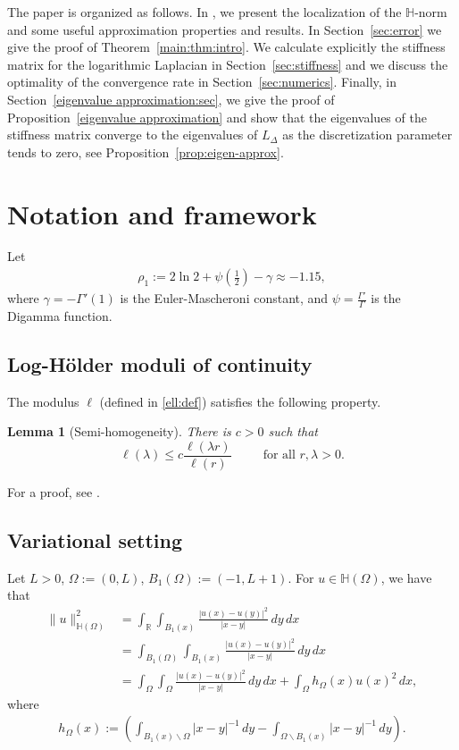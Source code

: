 \documentclass[10 pt]{article}
\newtheorem{lemma}[theorem]{Lemma}
\numberwithin{equation}{section}
\def\R{\mathbb{R}}
\def\mH{\mathbb{H}}
\begin{document}
The paper is organized as follows. In , we present the localization of the $\mathbb{H}$-norm and some useful approximation properties and results. In Section~\ref{sec:error} we give the proof of Theorem~\ref{main:thm:intro}. We calculate explicitly the stiffness matrix for the logarithmic Laplacian in Section~\ref{sec:stiffness} and we discuss the optimality of the convergence rate in Section~\ref{sec:numerics}. Finally, in Section~\ref{eigenvalue approximation:sec}, we give the proof of Proposition~\ref{eigenvalue approximation} and show that the eigenvalues of the stiffness matrix converge to the eigenvalues of $L_{\Delta}$ as the discretization parameter tends to zero, see Proposition~\ref{prop:eigen-approx}.


\section{Notation and framework} \label{sec:notation}

Let
\begin{align}\label{constants}
\rho_1:=2\ln 2 + \psi(\tfrac{1}{2})-\gamma\approx -1.15,
\end{align}
where $\gamma=-\Gamma'(1)$ is the Euler-Mascheroni constant, and $\psi=\frac{\Gamma'}{\Gamma}$ is the Digamma function.

\subsection{Log-Hölder moduli of continuity}

The modulus $\ell$ (defined in \eqref{ell:def}) satisfies the following property.

\begin{lemma}[Semi-homogeneity]\label{prop1}
There is $c>0$ such that 
\[
\ell(\lambda)\leq c\frac{\ell(\lambda r)}{\ell(r)}\,\qquad \text{ for all }r,\lambda >0.
\]
\end{lemma}
For a proof, see \cite[Lemma 3.2]{CS22}.

\subsection{Variational setting}
Let $L>0$, $\Omega:=(0,L)$, $B_1(\Omega):=(-1,L+1)$. For $u\in \mH(\Omega)$, we have that
\begin{align*}
    \|u\|^2_{\mathbb H(\Omega)}&=\int_{\R}\int_{B_1(x)}\frac{|u(x)-u(y)|^2}{|x-y|}\, dy\, dx\\
    &=\int_{B_1(\Omega)}\int_{B_1(x)}\frac{|u(x)-u(y)|^2}{|x-y|}\, dy\, dx\\
    &=\int_\Omega\int_\Omega \frac{|u(x)-u(y)|^2}{|x-y|}\, dy\, dx+\int_{\Omega}h_\Omega(x)u(x)^2\, dx,
\end{align*}
where
\begin{align*}
    h_\Omega(x):=\left(\int_{B_1(x)\backslash \Omega}|x-y|^{-1}\, dy - \int_{\Omega\backslash B_1(x)}|x-y|^{-1}\, dy\right).
\end{align*}
\end{document}
